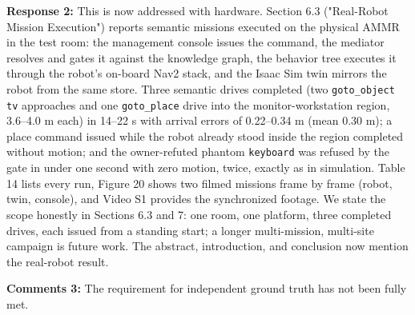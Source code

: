 \documentclass[11pt]{article}
\begin{document}
\textbf{Response 2:} This is now addressed with hardware. Section 6.3 ("Real-Robot Mission Execution") reports semantic missions executed on the physical AMMR in the test room: the management console issues the command, the mediator resolves and gates it against the knowledge graph, the behavior tree executes it through the robot's on-board Nav2 stack, and the Isaac Sim twin mirrors the robot from the same store. Three semantic drives completed (two \texttt{goto\_object tv} approaches and one \texttt{goto\_place} drive into the monitor-workstation region, 3.6--4.0 m each) in 14--22 s with arrival errors of 0.22--0.34 m (mean 0.30 m); a place command issued while the robot already stood inside the region completed without motion; and the owner-refuted phantom \texttt{keyboard} was refused by the gate in under one second with zero motion, twice, exactly as in simulation. Table 14 lists every run, Figure 20 shows two filmed missions frame by frame (robot, twin, console), and Video S1 provides the synchronized footage. We state the scope honestly in Sections 6.3 and 7: one room, one platform, three completed drives, each issued from a standing start; a longer multi-mission, multi-site campaign is future work. The abstract, introduction, and conclusion now mention the real-robot result.

\textbf{Comments 3:} The requirement for independent ground truth has not been fully met.
\end{document}
